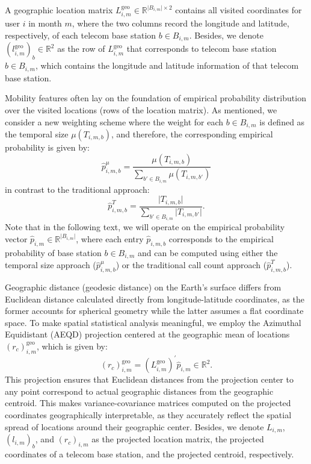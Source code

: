 \begin{definition}
A geographic location matrix $L^{\text{geo}}_{i, m} \in \mathbb{R}^{\lvert B_{i, m} \rvert \times 2}$ contains all visited coordinates for user $i$ in month $m$, where the two columns record the longitude and latitude, respectively, of each telecom base station $b \in B_{i, m}$.
Besides, we denote $(l^\text{geo}_{i, m})_b \in \mathbb{R}^2$ as the row of $L^\text{geo}_{i, m}$ that corresponds to telecom base station $b \in B_{i, m}$, which contains the longitude and latitude information of that telecom base station.
\end{definition}

Mobility features often lay on the foundation of empirical probability distribution over the visited locations (rows of the location matrix). As mentioned, we consider a new weighting scheme where the weight for each $b \in B_{i, m}$ is defined as the temporal size $\mu(T_{i, m, b})$, and therefore, the corresponding empirical probability is given by:
\begin{equation}
\hat{p}^{\mu}_{i, m, b}
=
\frac{\mu(T_{i, m, b})}{\sum_{b' \in B_{i, m}} \mu(T_{i, m, b'})}
\end{equation}
in contrast to the traditional approach:
\begin{equation}
\hat{p}^{T}_{i, m, b}
=
\frac{\lvert T_{i, m, b} \rvert}{\sum_{b' \in B_{i, m}} \lvert T_{i, m, b'} \rvert}.
\end{equation}
Note that in the following text, we will operate on the empirical probability vector $\hat{p}_{i, m} \in \mathbb{R}^{\lvert B_{i, m} \rvert}$, where each entry $\hat{p}_{i, m, b}$ corresponds to the empirical probability of base station $b \in B_{i, m}$ and can be computed using either the temporal size approach ($\hat{p}^{\mu}_{i, m, b}$) or the traditional call count approach ($\hat{p}^{T}_{i, m, b}$).

Geographic distance (geodesic distance) on the Earth's surface differs from Euclidean distance calculated directly from longitude-latitude coordinates, as the former accounts for spherical geometry while the latter assumes a flat coordinate space.
To make spatial statistical analysis meaningful, we employ the Azimuthal Equidistant (AEQD) projection centered at the geographic mean of locations $(r_c)^{\text{geo}}_{i, m}$, which is given by:
\begin{equation}
(r_c)^{\text{geo}}_{i, m}
=
(L^{\text{geo}}_{i, m})^{'} \hat{p}_{i, m}
\in \mathbb{R}^2.
\end{equation}
This projection ensures that Euclidean distances from the projection center to any point correspond to actual geographic distances from the geographic centroid.
This makes variance-covariance matrices computed on the projected coordinates geographically interpretable, as they accurately reflect the spatial spread of locations around their geographic center. Besides, we denote $L_{i, m}$, $(l_{i, m})_b$, and $(r_c)_{i, m}$ as the projected location matrix, the projected coordinates of a telecom base station, and the projected centroid, respectively.

